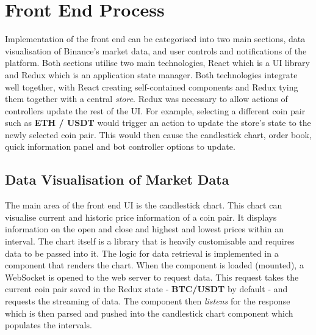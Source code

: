 \section{Front End Process}
\label{sec:implementation:frontend}

\noindent Implementation of the front end can be categorised into two main sections, data visualisation of Binance's market data, and user controls and notifications of the platform. Both sections utilise two main technologies, React which is a UI library and Redux which is an application state manager. Both technologies integrate well together, with React creating self-contained components and Redux tying them together with a central \textit{store}. Redux was necessary to allow actions of controllers update the rest of the UI. For example, selecting a different coin pair such as \textbf{ETH / USDT} would trigger an action to update the store's state to the newly selected coin pair. This would then cause the candlestick chart, order book, quick information panel and bot controller options to update. 

\subsection{Data Visualisation of Market Data}
\label{sec:implementation:frontend:data_vis}
\noindent The main area of the front end UI is the candlestick chart. This chart can visualise current and historic price information of a coin pair. It displays information on the open and close and highest and lowest prices within an interval. The chart itself is a library that is heavily customisable and requires data to be passed into it. The logic for data retrieval is implemented in a component that renders the chart. When the component is loaded (mounted), a WebSocket is opened to the web server to request data. This request takes the current coin pair saved in the Redux state - \textbf{BTC/USDT} by default - and requests the streaming of data. The component then \textit{listens} for the response which is then parsed and pushed into the candlestick chart component which populates the intervals.

